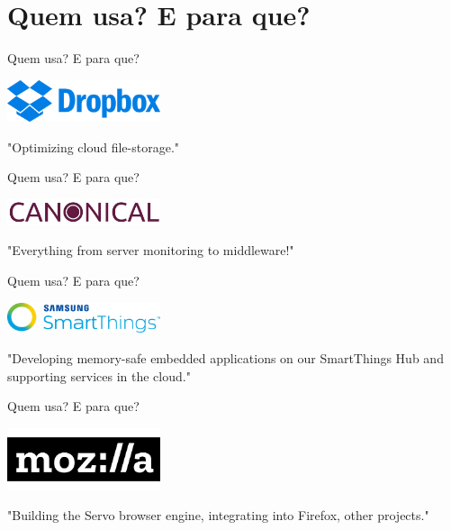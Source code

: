 \documentclass[aspectratio=169]{beamer}
\begin{document}
\section{Quem usa? E para que?}

\begin{frame}{Quem usa? E para que?}
	\begin{center}
		\includegraphics[width=4.5cm]{imgs/dropbox.png}	
		
		"Optimizing cloud file-storage."
	\end{center}
\end{frame}

\begin{frame}{Quem usa? E para que?}
	\begin{center}
		\includegraphics[width=4.5cm]{imgs/canonical.jpeg}	
		
		"Everything from server monitoring to middleware!"
	\end{center}
\end{frame}

\begin{frame}{Quem usa? E para que?}
	\begin{center}
		\includegraphics[width=4.5cm]{imgs/smartthings.png}	
		
		"Developing memory-safe embedded applications on our SmartThings Hub and supporting services in the cloud."
	\end{center}
\end{frame}

\begin{frame}{Quem usa? E para que?}
	\begin{center}
		\includegraphics[width=4.5cm]{imgs/mozilla.png}	
		
		"Building the Servo browser engine, integrating into Firefox, other projects."
	\end{center}
\end{frame}
\end{document}
